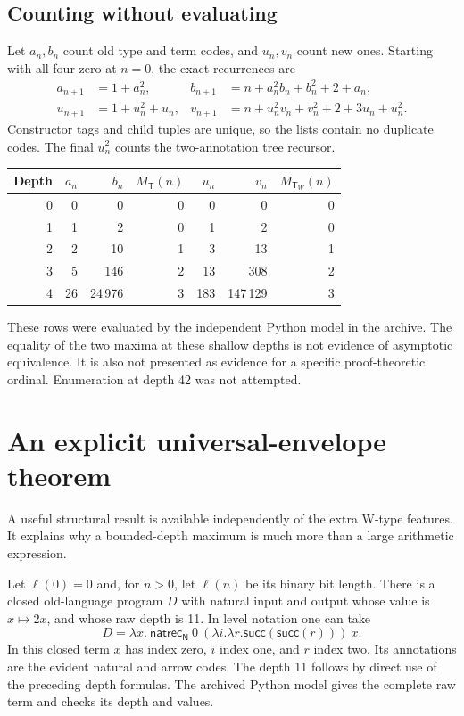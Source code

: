\documentclass[11pt]{article}
\theoremstyle{definition}
\newcommand{\T}{\mathsf T}
\newcommand{\TW}{\mathsf T_W}
\newcommand{\MT}{M_{\T}}
\newcommand{\MW}{M_{\TW}}
\begin{document}
\subsection{Counting without evaluating}
Let $a_n,b_n$ count old type and term codes, and $u_n,v_n$ count new ones.
Starting with all four zero at $n=0$, the exact recurrences are
\begin{align*}
 a_{n+1}&=1+a_n^2,&
 b_{n+1}&=n+a_n^2b_n+b_n^2+2+a_n,\\
 u_{n+1}&=1+u_n^2+u_n,&
 v_{n+1}&=n+u_n^2v_n+v_n^2+2+3u_n+u_n^2.
\end{align*}
Constructor tags and child tuples are unique, so the lists contain no duplicate
codes. The final $u_n^2$ counts the two-annotation tree recursor.

\begin{center}
\begin{tabular}{rrrrrrr}
\toprule
Depth & $a_n$ & $b_n$ & $\MT(n)$ & $u_n$ & $v_n$ & $\MW(n)$\\
\midrule
0 & 0 & 0 & 0 & 0 & 0 & 0\\
1 & 1 & 2 & 0 & 1 & 2 & 0\\
2 & 2 & 10 & 1 & 3 & 13 & 1\\
3 & 5 & 146 & 2 & 13 & 308 & 2\\
4 & 26 & 24\,976 & 3 & 183 & 147\,129 & 3\\
\bottomrule
\end{tabular}
\end{center}
These rows were evaluated by the independent Python model in the archive.
The equality of the two maxima at these shallow depths is not evidence of
asymptotic equivalence. It is also not presented as evidence for a specific
proof-theoretic ordinal. Enumeration at depth 42 was not attempted.

\section{An explicit universal-envelope theorem}
\label{sec:universal}
A useful structural result is available independently of the extra W-type
features. It explains why a bounded-depth maximum is much more than a large
arithmetic expression.

Let $\ell(0)=0$ and, for $n>0$, let $\ell(n)$ be its binary bit length. There is
a closed old-language program $D$ with natural input and output whose value is
$x\mapsto 2x$, and whose raw depth is 11. In level notation one can take
\[
 D=\lambda x.\ \mathsf{natrec}_{\mathsf N}\ 0\
       (\lambda i.\lambda r.\mathsf{succ}(\mathsf{succ}(r)))\ x.
\]
In this closed term $x$ has index zero, $i$ index one, and $r$ index two.
Its annotations are the evident natural and arrow codes. The depth 11 follows
by direct use of the preceding depth formulas. The archived Python model gives
the complete raw term and checks its depth and values.
\end{document}
